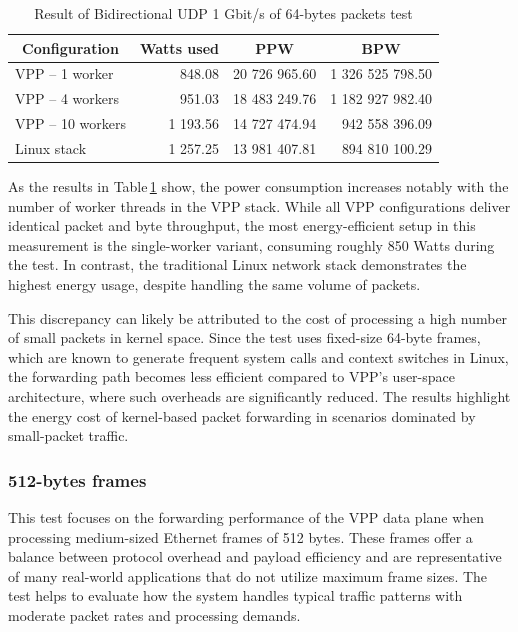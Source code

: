 \begin{table}[h!]
\centering
\begin{tabular}{|l|r|r|r|}
\hline
\multicolumn{1}{|c|}{\textbf{Configuration}} &
\multicolumn{1}{c|}{\textbf{Watts used}} &
\multicolumn{1}{c|}{\textbf{PPW}} &
\multicolumn{1}{c|}{\textbf{BPW}} \\
\hline
VPP -- 1 worker & 848.08 & 20 726 965.60 & 1 326 525 798.50 \\
VPP -- 4 workers & 951.03 & 18 483 249.76 & 1 182 927 982.40 \\
VPP -- 10 workers & 1 193.56 & 14 727 474.94 & 942 558 396.09 \\
Linux stack & 1 257.25 & 13 981 407.81 & 894 810 100.29 \\
\hline
\end{tabular}
\caption{Result of Bidirectional UDP 1 Gbit/s of 64-bytes packets test}
\label{tab:udp:one}
\end{table}

As the results in Table \ref{tab:udp:one} show, the power consumption increases notably with the number of worker threads in the VPP stack. 
While all VPP configurations deliver identical packet and byte throughput, the most energy-efficient setup in this measurement is the single-worker variant, consuming roughly 850 Watts during the test. 
In contrast, the traditional Linux network stack demonstrates the highest energy usage, despite handling the same volume of packets.

This discrepancy can likely be attributed to the cost of processing a high number of small packets in kernel space. 
Since the test uses fixed-size 64-byte frames, which are known to generate frequent system calls and context switches in Linux, 
the forwarding path becomes less efficient compared to VPP’s user-space architecture, where such overheads are significantly reduced. 
The results highlight the energy cost of kernel-based packet forwarding in scenarios dominated by small-packet traffic.

\subsubsection{512-bytes frames}
This test focuses on the forwarding performance of the VPP data plane when processing medium-sized Ethernet frames of 512 bytes. 
These frames offer a balance between protocol overhead and payload efficiency and are representative of many real-world applications that do not utilize maximum frame sizes. 
The test helps to evaluate how the system handles typical traffic patterns with moderate packet rates and processing demands.

